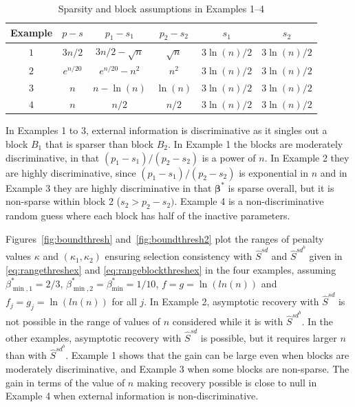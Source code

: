 \documentclass[
  12pt]{article}
\newcommand{\bbeta}{\boldsymbol{\beta}}
\begin{document}
\begin{table}[ht]
\caption{Sparsity and block assumptions in Examples 1--4}
\label{tab:examples}
\begin{center}
\begin{tabular}[]{@{}cccccc@{}}
\hline
Example & $p-s$ & $p_1-s_1$ & $p_2-s_2$ & $s_1$ 
& $s_2$\\
\hline
$1$    & $3n/2$ & $3n/2-\sqrt{n}$ & $\sqrt{n}$  & $3\ln(n)/2$  & $3\ln(n)/2$ \\
$2$    & $e^{n/20}$ & $e^{n/20}-n^2$ & $n^2$  & $3\ln(n)/2$  & $3\ln(n)/2$   \\
$3$    & $n$ & $n-\ln(n)$ & $\ln(n)$  & $3\ln(n)/2$  & $3\ln(n)/2$   \\
$4$    & $n$ & $n/2$ & $n/2$  & $3\ln(n)/2$  & $3\ln(n)/2$\\
\hline
\end{tabular}
\end{center}
\end{table}

In Examples 1 to 3, external information is discriminative as it singles out a block $B_1$ that is sparser than block $B_2$. In Example 1 the blocks are moderately discriminative, in that $(p_1-s_1)/(p_2-s_2)$ is a power of $n$. In Example 2 they are highly discriminative, since $(p_1-s_1)/(p_2-s_2)$ is exponential in $n$ and in Example 3 they are highly discriminative in that $\bbeta^*$ is sparse overall, but it is non-sparse within block 2 ($s_2 > p_2 - s_2)$. Example 4 is a non-discriminative random guess where each block has half of the inactive parameters. 

Figures~\ref{fig:boundthresh} and~\ref{fig:boundthresh2} plot the ranges of penalty values $\kappa$ and $(\kappa_1,\kappa_2)$ ensuring selection consistency with $\hat{S}^{sd}$ and $\hat{S}^{sd}^{b}$ given in \eqref{eq:rangethreshex} and \eqref{eq:rangeblockthreshex} in the four examples, assuming $\beta^*_{\min,1}=2/3$, $\beta^*_{\min,2}=\beta^*_{\min}=1/10$, $f=g=\ln(ln(n))$ and $f_j=g_j=\ln(ln(n))$ for all $j$. In Example 2, asymptotic recovery with $\hat{S}^{sd}$ is not possible in the range of values of $n$ considered while it is with $\hat{S}^{sd}^{b}$.
In the other examples, asymptotic recovery with $\hat{S}^{sd}$ is possible, but it requires larger $n$ than with $\hat{S}^{sd}^b$. Example 1 shows that the gain can be large even when blocks are moderately discriminative, and Example 3 when some blocks are non-sparse.
The gain in terms of the value of $n$ making recovery possible  is close to null in Example 4 when external information is non-discriminative. 
\end{document}
